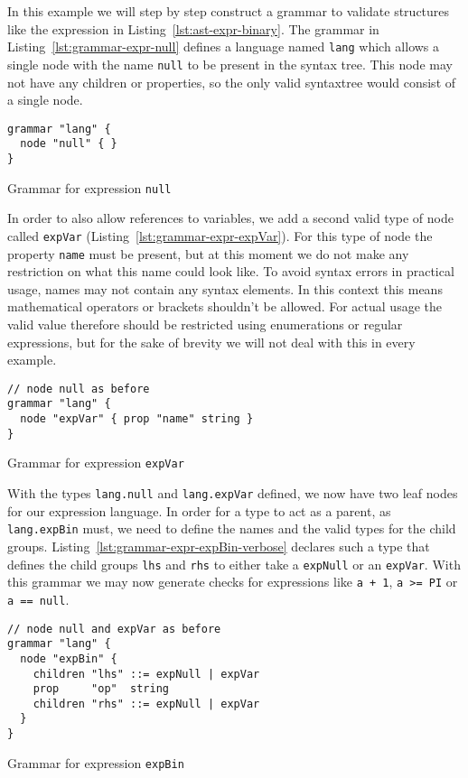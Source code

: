 \documentclass[sigconf,natbib=false]{acmart}
\begin{document}
In this example we will step by step construct a grammar to validate structures like the expression in Listing~\ref{lst:ast-expr-binary}. The grammar in Listing~\ref{lst:grammar-expr-null} defines a language named \texttt{lang} which allows a single node with the name \texttt{null} to be present in the syntax tree. This node may not have any children or properties, so the only valid syntaxtree would consist of a single node.

\begin{listing}[H]
\begin{verbatim}
grammar "lang" {
  node "null" { }
}
\end{verbatim}
\caption{Grammar for expression \texttt{null}}
\label{lst:grammar-expr-null}
\end{listing}

In order to also allow references to variables, we add a second valid type of node called \texttt{expVar} (Listing~\ref{lst:grammar-expr-expVar}). For this type of node the property \texttt{name} must be present, but at this moment we do not make any restriction on what this name could look like. To avoid syntax errors in practical usage, names may not contain any syntax elements. In this context this means mathematical operators or brackets shouldn't be allowed. For actual usage the valid value therefore should be restricted using enumerations or regular expressions, but for the sake of brevity we will not deal with this in every example.

\begin{listing}[H]
\begin{verbatim}
// node null as before
grammar "lang" {
  node "expVar" { prop "name" string }
}
\end{verbatim}
\caption{Grammar for expression \texttt{expVar}}
\label{lst:grammar-expr-expVar}
\end{listing}

With the types \texttt{lang.null} and \texttt{lang.expVar} defined, we now have two leaf nodes for our expression language. In order for a type to act as a parent, as \texttt{lang.expBin} must, we need to define the names and the valid types for the child groups. Listing~\ref{lst:grammar-expr-expBin-verbose} declares such a type that defines the child groups \texttt{lhs} and \texttt{rhs} to either take a \texttt{expNull} or an \texttt{expVar}. With this grammar we may now generate checks for expressions like \texttt{a + 1}, \texttt{a >= PI} or \texttt{a == null}.

\begin{listing}[H]
\begin{verbatim}
// node null and expVar as before
grammar "lang" {
  node "expBin" {
    children "lhs" ::= expNull | expVar
    prop     "op"  string
    children "rhs" ::= expNull | expVar
  }
}
\end{verbatim}
\caption{Grammar for expression \texttt{expBin}}
\label{lst:grammar-expr-expBin-verbose}
\end{listing}
\end{document}
